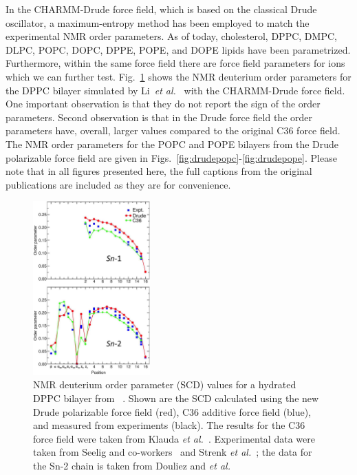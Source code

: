 \documentclass[12pt]{article}
\begin{document}
In the CHARMM-Drude force field, which is based on the classical Drude oscillator, a
maximum-entropy method has been employed to match the experimental NMR order
parameters. As of today, cholesterol, DPPC, DMPC, DLPC, POPC, DOPC, DPPE, POPE, and DOPE
lipids have been parametrized. Furthermore, within the same force field there
are force field parameters for ions which we can further test. Fig.~\ref{fig:drudedppc} shows the NMR deuterium order parameters for the DPPC bilayer simulated by Li~\textit{et al.}~\cite{li2017drude} with the
CHARMM-Drude force field. One important observation is that they do not report
the sign of the order parameters. Second observation is that in the Drude force
field the order parameters have, overall, larger values compared to the original
C36 force field. The NMR order parameters for the POPC and POPE bilayers from the Drude polarizable force field are given in Figs.~\ref{fig:drudepopc}-\ref{fig:drudepope}. Please note that in all figures presented here, the full captions from the original publications are included as they are for convenience.\\

\begin{figure}[!hbt]
  \centering
  \includegraphics[width=0.4\textwidth]{../Figures/dppc_order_parameters_drude.png}
  \caption{NMR deuterium order parameter (SCD) values for a
  	hydrated DPPC bilayer from ~\cite{li2017drude}. Shown are the SCD calculated using the new
  	Drude polarizable force field (red), C36 additive force field (blue), and
  	measured from experiments (black). The results for the C36 force field
  	were taken from Klauda \textit{et al.}~\cite{klauda2010update}. Experimental data were taken from Seelig and co-workers~\cite{seelig1974dynamic,seelig1975bilayers,gally1975conformation,gally1981structure} and Strenk \textit{et al.}~\cite{strenk1985model}; the data for the Sn-2 chain is taken from Douliez and \textit{et al.}~\cite{douliez1995restatement}}
  \label{fig:drudedppc}
\end{figure}
\end{document}
